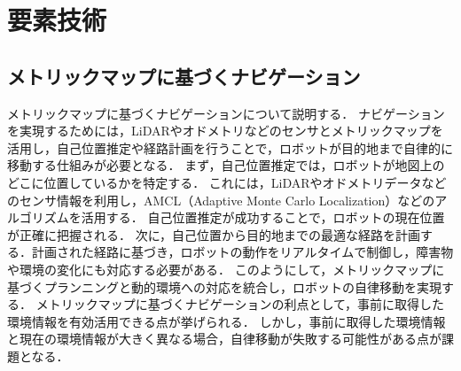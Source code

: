 \chapter{要素技術}
\section{メトリックマップに基づくナビゲーション}
メトリックマップに基づくナビゲーションについて説明する．
ナビゲーションを実現するためには，LiDARやオドメトリなどのセンサとメトリックマップを活用し，自己位置推定や経路計画を行うことで，ロボットが目的地まで自律的に移動する仕組みが必要となる．
まず，自己位置推定では，ロボットが地図上のどこに位置しているかを特定する．
これには，LiDARやオドメトリデータなどのセンサ情報を利用し，AMCL（Adaptive Monte Carlo Localization）などのアルゴリズムを活用する．
自己位置推定が成功することで，ロボットの現在位置が正確に把握される．
次に，自己位置から目的地までの最適な経路を計画する．計画された経路に基づき，ロボットの動作をリアルタイムで制御し，障害物や環境の変化にも対応する必要がある．
このようにして，メトリックマップに基づくプランニングと動的環境への対応を統合し，ロボットの自律移動を実現する．
メトリックマップに基づくナビゲーションの利点として，事前に取得した環境情報を有効活用できる点が挙げられる．
しかし，事前に取得した環境情報と現在の環境情報が大きく異なる場合，自律移動が失敗する可能性がある点が課題となる．